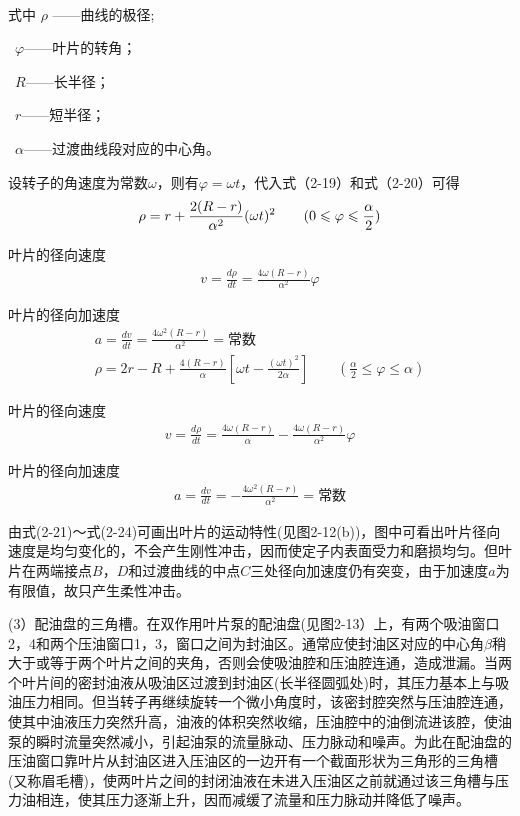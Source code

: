 \\式中 \quad $\rho$ ——曲线的极径;
\par \quad \ $\varphi $——叶片的转角；
\par \quad \ $R$——长半径；
\par \quad \ $r$——短半径；
\par \quad \ $\alpha $——过渡曲线段对应的中心角。
\par 设转子的角速度为常数$\omega $，则有$\varphi =\omega t$，代入式（2-19）和式（2-20）可得
\begin{gather}
\rho =r+\frac{2(R-r)}{\alpha ^2} (\omega t)^2 \qquad (0\leqslant \varphi \leqslant \frac{\alpha }{2} ) \notag
\end{gather}
\par  叶片的径向速度
\begin{gather}
 v=\frac{d \rho }{d t}  =\frac{4\omega (R-r)}{\alpha ^2} \varphi 
\end{gather}
\par  叶片的径向加速度
\begin{gather}
a=\frac{dv}{dt} =\frac{4\omega ^2(R-r)}{\alpha ^2} =\mbox{常数} \\
\rho =2r-R+\frac{4(R-r)}{\alpha } [ \omega t-\frac{(\omega t)^2}{2\alpha } ]  \qquad (\frac{\alpha }{2}\leqslant \varphi \leqslant \alpha  )
\end{gather}
\par  叶片的径向速度
\begin{gather}
v=\frac{d \rho }{d t} =\frac{4\omega (R-r)}{\alpha } -\frac{4\omega (R-r)}{\alpha ^2} \varphi 
\end{gather}
\par  叶片的径向加速度
\begin{gather}
a=\frac{dv}{dt} =-\frac{4\omega ^2(R-r)}{\alpha ^2} =\mbox{常数}
\end{gather}
\par 由式(2-21)～式(2-24)可画出叶片的运动特性(见图2-12(b))，图中可看出叶片径向速度是均匀变化的，不会产生刚性冲击，因而使定子内表面受力和磨损均匀。但叶片在两端接点$B$，$D$和过渡曲线的中点$C$三处径向加速度仍有突变，由于加速度$a$为有限值，故只产生柔性冲击。
\par (3）配油盘的三角槽。在双作用叶片泵的配油盘(见图2-13）上，有两个吸油窗口2，4和两个压油窗口1，3，窗口之间为封油区。通常应使封油区对应的中心角$\beta$稍大于或等于两个叶片之间的夹角，否则会使吸油腔和压油腔连通，造成泄漏。当两个叶片间的密封油液从吸油区过渡到封油区(长半径圆弧处)时，其压力基本上与吸油压力相同。但当转子再继续旋转一个微小角度时，该密封腔突然与压油腔连通，使其中油液压力突然升高，油液的体积突然收缩，压油腔中的油倒流进该腔，使油泵的瞬时流量突然减小，引起油泵的流量脉动、压力脉动和噪声。为此在配油盘的压油窗口靠叶片从封油区进入压油区的一边开有一个截面形状为三角形的三角槽(又称眉毛槽)，使两叶片之间的封闭油液在未进入压油区之前就通过该三角槽与压力油相连，使其压力逐渐上升，因而减缓了流量和压力脉动并降低了噪声。